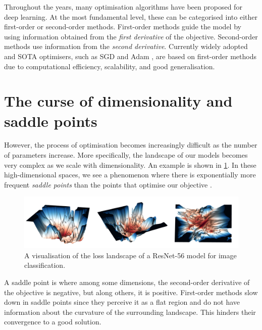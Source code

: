 Throughout the years, many optimisation algorithms have been proposed for deep learning. At the most fundamental level, these can be categorised into either first-order or second-order methods. First-order methods guide the model by using information obtained from the \textit{first derivative} of the objective. Second-order methods use information from the \textit{second derivative}. Currently widely adopted and SOTA optimisers, such as SGD \citep{robbins1951stochastic} and Adam \citep{kingma2014adam}, are based on first-order methods due to computational efficiency, scalability, and good generalisation. 

\section{The curse of dimensionality and saddle points}
\label{sec:curse_of_dimensionality}

However, the process of optimisation becomes increasingly difficult as the number of parameters increase. More specifically, the landscape of our models becomes very complex as we scale with dimensionality. An example is shown in \cref{fig:high_dim_resnet}. In these high-dimensional spaces, we see a phenomenon where there is exponentially more frequent \textit{saddle points} than the points that optimise our objective \citep{dauphin2014sfn}. 

\begin{figure}[h]
  \centering
    \includegraphics[width=\textwidth]{figures/0intro/intro_landscape.png}
    \caption{A visualisation of the loss landscape of a ResNet-56 model for image classification.}
    \label{fig:high_dim_resnet}
\end{figure}

A saddle point is where among some dimensions, the second-order derivative of the objective is negative, but along others, it is positive. First-order methods slow down in saddle points since they perceive it as a flat region and do not have information about the curvature of the surrounding landscape. This hinders their convergence to a good solution. 

